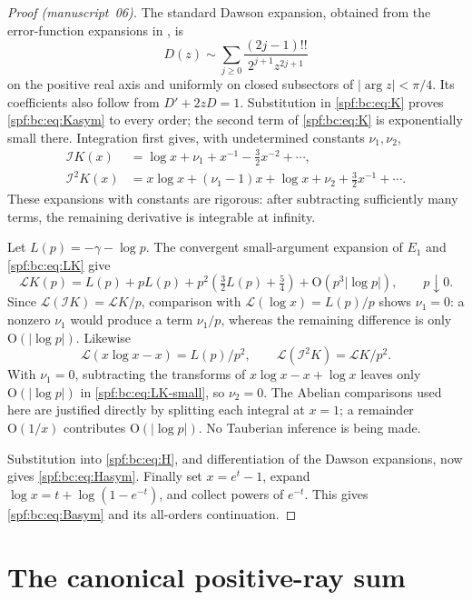 \documentclass[11pt]{article}
\numberwithin{equation}{section}
\theoremstyle{definition}
\theoremstyle{remark}
\theoremstyle{definition}
\newcommand{\bigO}{\mathrm O}
\newcommand{\bcI}{\mathcal I}
\begin{document}
\begin{proof}[Proof (manuscript~06)]
The standard Dawson expansion, obtained from the error-function expansions
in \cite{bcDlmfErf}, is
\[
 D(z)\sim\sum_{j\ge0}\frac{(2j-1)!!}{2^{j+1}z^{2j+1}}
\]
on the positive real axis and uniformly on closed subsectors of
$|\arg z|<\pi/4$. Its coefficients also follow from $D'+2zD=1$.
Substitution in \eqref{spf:bc:eq:K} proves \eqref{spf:bc:eq:Kasym} to every order; the
second term of \eqref{spf:bc:eq:K} is exponentially small there. Integration first
gives, with undetermined constants $\nu_1,\nu_2$,
\begin{align*}
 \bcI K(x)&=\log x+\nu_1+x^{-1}-\tfrac32x^{-2}+\cdots,\\
 \bcI^2K(x)&=x\log x+(\nu_1-1)x+\log x+\nu_2
                              +\tfrac32x^{-1}+\cdots.
\end{align*}
These expansions with constants are rigorous: after subtracting sufficiently
many terms, the remaining derivative is integrable at infinity.

Let $L(p)=-\gamma-\log p$. The convergent small-argument expansion of $E_1$
\cite{bcDlmfEone} and \eqref{spf:bc:eq:LK} give
\begin{equation}
 \mathscr L K(p)=L(p)+pL(p)
          +p^2\left(\tfrac32L(p)+\tfrac54\right)
          +\bigO(p^3|\log p|),\qquad p\downarrow0.
 \label{spf:bc:eq:LK-small}
\end{equation}
Since $\mathscr L(\bcI K)=\mathscr L K/p$, comparison with
$\mathscr L(\log x)=L(p)/p$ shows $\nu_1=0$: a nonzero $\nu_1$ would produce a
term $\nu_1/p$, whereas the remaining difference is only
$\bigO(|\log p|)$. Likewise
\[
 \mathscr L(x\log x-x)=L(p)/p^2,\qquad
 \mathscr L(\bcI^2K)=\mathscr L K/p^2.
\]
With $\nu_1=0$, subtracting the transforms of $x\log x-x+\log x$ leaves
only $\bigO(|\log p|)$ in \eqref{spf:bc:eq:LK-small}, so $\nu_2=0$.
The Abelian comparisons used here are justified directly by splitting each
integral at $x=1$; a remainder $\bigO(1/x)$ contributes
$\bigO(|\log p|)$. No Tauberian inference is being made.

Substitution into \eqref{spf:bc:eq:H}, and differentiation of the Dawson expansions,
now gives \eqref{spf:bc:eq:Hasym}. Finally set $x=e^t-1$, expand
$\log x=t+\log(1-e^{-t})$, and collect powers of $e^{-t}$. This gives
\eqref{spf:bc:eq:Basym} and its all-orders continuation.
\end{proof}

\section{The canonical positive-ray sum}
\label{spf:bc:sec:sum}
\end{document}
